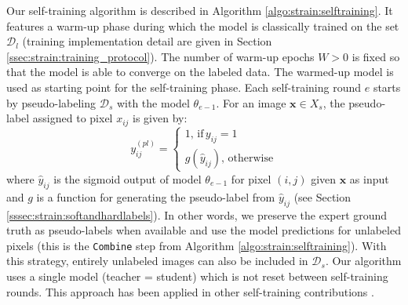 Our self-training algorithm is described in Algorithm \ref{algo:strain:selftraining}. It features a warm-up phase during which the model is classically trained on the set $\mathcal{D}_l$ (training implementation detail are given in Section \ref{ssec:strain:training_protocol}). The number of warm-up epochs $W > 0$ is fixed so that the model is able to converge on the labeled data. The warmed-up model is used as starting point for the self-training phase. Each self-training round $e$ starts by pseudo-labeling $\mathcal{D}_s$ with the model $\theta_{e-1}$. For an image $\mathbf{x} \in X_s$, the pseudo-label assigned to pixel $x_{ij}$ is given by:
\begin{equation}
y^{({pl})}_{ij} = \begin{cases}
1,\,\text{if}\, y_{ij} = 1 \\
g(\hat{y}_{ij}),\,\text{otherwise}
\end{cases}
\label{eqn:strain:pseudolabeling}
\end{equation}
where $\hat{y}_{ij}$ is the sigmoid output of model $\theta_{e-1}$ for pixel $(i, j)$ given $\mathbf{x}$ as input and $g$ is a function for generating the pseudo-label from $\hat{y}_{ij}$ (see Section \ref{sssec:strain:softandhardlabels}). In other words, we preserve the expert ground truth as pseudo-labels when available and use the model predictions for unlabeled pixels (this is the \texttt{Combine} step from Algorithm \ref{algo:strain:selftraining}). With this strategy, entirely unlabeled images can also be included in $\mathcal{D}_s$. Our algorithm uses a single model (\ie teacher = student) which is not reset between self-training rounds. This approach has been applied in other self-training contributions \parencite{laine2016temporal, bai2017semi, li2018based}. 

